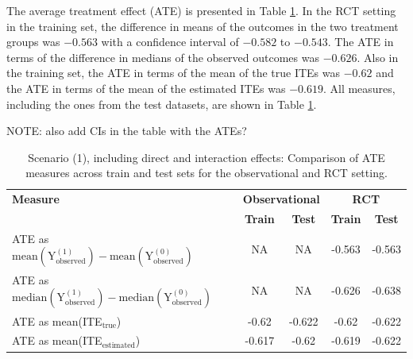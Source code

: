 The average treatment effect (ATE) is presented in Table \ref{tab:scenario1_ate_comparison}. In the RCT setting in the training set, the difference in means of the outcomes in the two treatment groups was $-0.563$ with a confidence interval of $-0.582$ to $-0.543$. The ATE in terms of the difference in medians of the observed outcomes was $-0.626$. Also in the training set, the ATE in terms of the mean of the true ITEs was $-0.62$ and the ATE in terms of the mean of the estimated ITEs was $-0.619$. All measures, including the ones from the test datasets, are shown in Table \ref{tab:scenario1_ate_comparison}.

NOTE: also add CIs in the table with the ATEs?

\begin{table}[htbp]
\centering
\small
\caption{Scenario (1), including direct and interaction effects: Comparison of ATE measures across train and test sets for the observational and RCT setting.}
\label{tab:scenario1_ate_comparison}
\begin{tabular}{l c c c c}
\toprule
\textbf{Measure} & \multicolumn{2}{c}{\textbf{Observational}} & \multicolumn{2}{c}{\textbf{RCT}} \\
\cmidrule(lr){2-3} \cmidrule(lr){4-5}
 & \textbf{Train} & \textbf{Test} & \textbf{Train} & \textbf{Test} \\
\midrule
ATE as $\text{mean}(\text{Y}_\text{observed}^{(1)}) - \text{mean}(\text{Y}_\text{observed}^{(0)})$ & NA & NA & -0.563 & -0.563 \\
ATE as $\text{median}(\text{Y}_\text{observed}^{(1)}) - \text{median}(\text{Y}_\text{observed}^{(0)})$  & NA & NA & -0.626 & -0.638 \\
ATE as mean(ITE$_\text{true}$)  & -0.62 & -0.622 & -0.62 & -0.622 \\
ATE as mean(ITE$_\text{estimated}$) & -0.617 & -0.62 & -0.619 & -0.622 \\
\bottomrule
\end{tabular}
\end{table}




